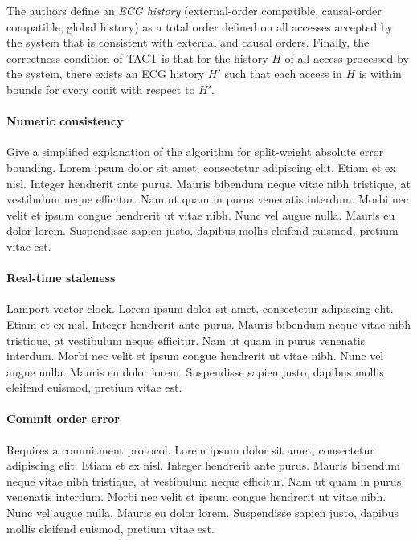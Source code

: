 The authors define an \emph{ECG history} (external-order compatible,
causal-order compatible, global history) as a total order defined on
all accesses accepted by the system that is consistent with external
and causal orders. Finally, the correctness condition of TACT is that
for the history $H$ of all access processed by the system, there
exists an ECG history $H'$ such that each access in $H$ is within
bounds for every conit with respect to $H'$.

\paragraph{Numeric consistency}

Give a simplified explanation of the algorithm for split-weight
absolute error bounding. Lorem ipsum dolor sit amet, consectetur
adipiscing elit. Etiam et ex nisl. Integer hendrerit ante
purus. Mauris bibendum neque vitae nibh tristique, at vestibulum neque
efficitur. Nam ut quam in purus venenatis interdum. Morbi nec velit et
ipsum congue hendrerit ut vitae nibh. Nunc vel augue nulla. Mauris eu
dolor lorem. Suspendisse sapien justo, dapibus mollis eleifend
euismod, pretium vitae est.

\paragraph{Real-time staleness}

Lamport vector clock. Lorem ipsum dolor sit amet, consectetur
adipiscing elit. Etiam et ex nisl. Integer hendrerit ante
purus. Mauris bibendum neque vitae nibh tristique, at vestibulum neque
efficitur. Nam ut quam in purus venenatis interdum. Morbi nec velit et
ipsum congue hendrerit ut vitae nibh. Nunc vel augue nulla. Mauris eu
dolor lorem. Suspendisse sapien justo, dapibus mollis eleifend
euismod, pretium vitae est.

\paragraph{Commit order error} Requires a commitment protocol. Lorem ipsum dolor sit amet,
consectetur adipiscing elit. Etiam et ex nisl. Integer hendrerit ante
purus. Mauris bibendum neque vitae nibh tristique, at vestibulum neque
efficitur. Nam ut quam in purus venenatis interdum. Morbi nec velit et
ipsum congue hendrerit ut vitae nibh. Nunc vel augue nulla. Mauris eu
dolor lorem. Suspendisse sapien justo, dapibus mollis eleifend
euismod, pretium vitae est.

